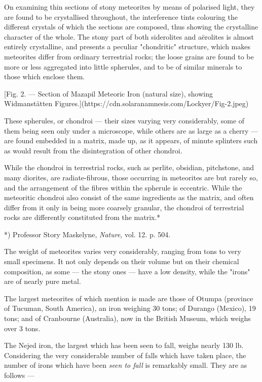 \documentclass[a4paper, 12pt, oneside, polutonikogreek, english]{article}
\begin{document}
On examining thin sections of stony meteorites by means of polarised light, they are found to be crystallised throughout, the interference tints colouring the different crystals of which the sections are composed, thus showing the crystalline character of the whole. The stony part of both siderolites and aërolites is almost entirely crystalline, and presents a peculiar "chondritic" structure, which makes meteorites differ from ordinary terrestrial rocks; the loose grains are found to be more or less aggregated into little spherules, and to be of similar minerals to those which enclose them.

[Fig. 2. --- Section of Mazapil Meteoric Iron (natural size), showing Widmanstätten Figures.](https://cdn.solaranamnesis.com/Lockyer/Fig-2.jpeg)

These spherules, or chondroi --- their sizes varying very considerably, some of them being seen only under a microscope, while others are as large as a cherry --- are found embedded in a matrix, made up, as it appears, of minute splinters such as would result from the disintegration of other chondroi.

While the chondroi in terrestrial rocks, such as perlite, obsidian, pitchstone, and many diorites, are radiate-fibrous, those occurring in meteorites are but rarely so, and the arrangement of the fibres within the spherule is eccentric. While the meteoritic chondroi also consist of the same ingredients as the matrix, and often differ from it only in being more coarsely granular, the chondroi of terrestrial rocks are differently constituted from the matrix.*

*) Professor Story Maskelyne, \emph{Nature}, vol. 12. p. 504.

The weight of meteorites varies very considerably, ranging from tons to very small specimens. It not only depends on their volume but on their chemical composition, as some --- the stony ones --- have a low density, while the "irons" are of nearly pure metal.

The largest meteorites of which mention is made are those of Otumpa (province of Tucuman, South America), an iron weighing 30 tons; of Durango (Mexico), 19 tons; and of Cranbourne (Australia), now in the British Museum, which weighs over 3 tons.

The Nejed iron, the largest which has been seen to fall, weighs nearly 130 lb. Considering the very considerable number of falls which have taken place, the number of irons which have been \emph{seen to fall} is remarkably small. They are as follows ---
\end{document}
